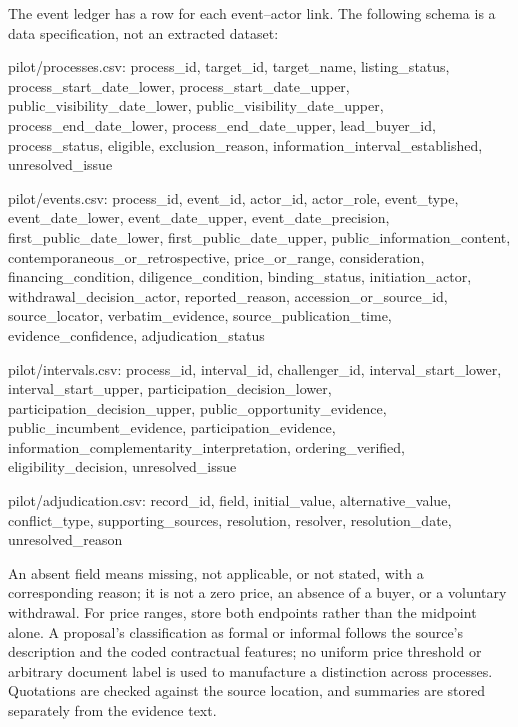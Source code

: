 \documentclass[
  11pt,
]{article}
\newenvironment{Shaded}{}{}
\newcommand{\NormalTok}[1]{#1}
\begin{document}
The event ledger has a row for each event--actor link. The following
schema is a data specification, not an extracted dataset:

\begin{Shaded}
\begin{Highlighting}[]
\NormalTok{pilot/processes.csv:}
\NormalTok{process\_id, target\_id, target\_name, listing\_status,}
\NormalTok{process\_start\_date\_lower, process\_start\_date\_upper,}
\NormalTok{public\_visibility\_date\_lower, public\_visibility\_date\_upper,}
\NormalTok{process\_end\_date\_lower, process\_end\_date\_upper,}
\NormalTok{lead\_buyer\_id, process\_status, eligible, exclusion\_reason,}
\NormalTok{information\_interval\_established, unresolved\_issue}

\NormalTok{pilot/events.csv:}
\NormalTok{process\_id, event\_id, actor\_id, actor\_role, event\_type,}
\NormalTok{event\_date\_lower, event\_date\_upper, event\_date\_precision,}
\NormalTok{first\_public\_date\_lower, first\_public\_date\_upper,}
\NormalTok{public\_information\_content, contemporaneous\_or\_retrospective,}
\NormalTok{price\_or\_range, consideration, financing\_condition,}
\NormalTok{diligence\_condition, binding\_status, initiation\_actor,}
\NormalTok{withdrawal\_decision\_actor, reported\_reason,}
\NormalTok{accession\_or\_source\_id, source\_locator, verbatim\_evidence,}
\NormalTok{source\_publication\_time, evidence\_confidence, adjudication\_status}

\NormalTok{pilot/intervals.csv:}
\NormalTok{process\_id, interval\_id, challenger\_id,}
\NormalTok{interval\_start\_lower, interval\_start\_upper,}
\NormalTok{participation\_decision\_lower, participation\_decision\_upper,}
\NormalTok{public\_opportunity\_evidence, public\_incumbent\_evidence,}
\NormalTok{participation\_evidence, information\_complementarity\_interpretation,}
\NormalTok{ordering\_verified, eligibility\_decision, unresolved\_issue}

\NormalTok{pilot/adjudication.csv:}
\NormalTok{record\_id, field, initial\_value, alternative\_value,}
\NormalTok{conflict\_type, supporting\_sources, resolution, resolver,}
\NormalTok{resolution\_date, unresolved\_reason}
\end{Highlighting}
\end{Shaded}

An absent field means missing, not applicable, or not stated, with a
corresponding reason; it is not a zero price, an absence of a buyer, or
a voluntary withdrawal. For price ranges, store both endpoints rather
than the midpoint alone. A proposal's classification as formal or
informal follows the source's description and the coded contractual
features; no uniform price threshold or arbitrary document label is used
to manufacture a distinction across processes. Quotations are checked
against the source location, and summaries are stored separately from
the evidence text.
\end{document}
